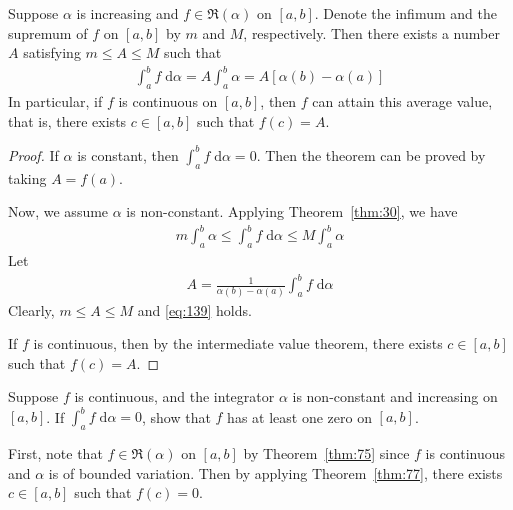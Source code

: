 \documentclass[thmcnt=section, 12pt]{my-elegantbook}
\begin{document}
\begin{theorem} \label{thm:77}
    Suppose $ \alpha $ is increasing
    and $f \in \mathfrak{R}(\alpha)$ on $[a, b]$.
    Denote the infimum and the supremum of $f$ on $[a, b]$
    by $m$ and $M$, respectively.
    Then there exists a number $A$ satisfying
    $m \leq A \leq M$ such that
    \begin{align}
        \int_a^b f \; \mathrm{d} \alpha
        = A \int_a^b \alpha
        = A [ \alpha(b) - \alpha(a) ]
        \label{eq:139}
    \end{align}
    In particular, if $f$ is continuous on $[a, b]$,
    then $f$ can attain this average value, that is,
    there exists $c \in [a, b]$ such that $f(c) = A$.
\end{theorem}

\begin{proof}
    If $\alpha$ is constant, then $\int_a^b f \; \mathrm{d} \alpha = 0$.
    Then the theorem can be proved by taking $A = f(a)$.

    Now, we assume $\alpha$ is non-constant.
    Applying Theorem~\ref{thm:30}, we have
    \begin{align*}
        m \int_a^b \alpha
        \leq \int_a^b f \; \mathrm{d} \alpha
        \leq M \int_a^b \alpha
    \end{align*}
    Let
    \begin{align*}
        A = \frac{1}{ \alpha(b) - \alpha(a) }
        \int_a^b f \; \mathrm{d} \alpha
    \end{align*}
    Clearly, $m \leq A \leq M$ and \eqref{eq:139} holds.

    If $f$ is continuous, then by the intermediate value theorem,
    there exists $c \in [a, b]$ such that $f(c) = A$.
\end{proof}

\begin{exercise} \label{ex:9}
    Suppose $f$ is continuous,
    and the integrator $\alpha$ is non-constant
    and increasing on $[a, b]$.
    If $\int_a^b f \; \mathrm{d} \alpha = 0$,
    show that $f$ has at least one zero on $[a, b]$.
\end{exercise}

\begin{solution}
    First, note that $f \in \mathfrak{R}(\alpha)$ on $[a, b]$
    by Theorem~\ref{thm:75} since $f$ is continuous
    and $\alpha$ is of bounded variation.
    Then by applying Theorem~\ref{thm:77},
    there exists $c \in [a, b]$ such that
    $f(c) = 0$.
\end{solution}
\end{document}
